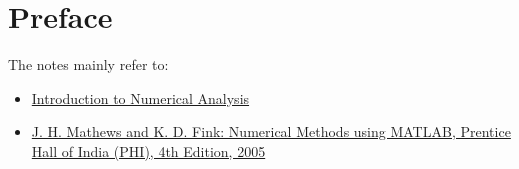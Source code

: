 \chapter*{Preface}

The notes mainly refer to:
\begin{itemize}
    \item \href{https://www.math.iitb.ac.in/~baskar/book.pdf}{Introduction to Numerical Analysis}
    \item \href{}{J. H. Mathews and K. D. Fink: Numerical Methods using
    MATLAB, Prentice Hall of India (PHI), 4th Edition, 2005}
\end{itemize}

